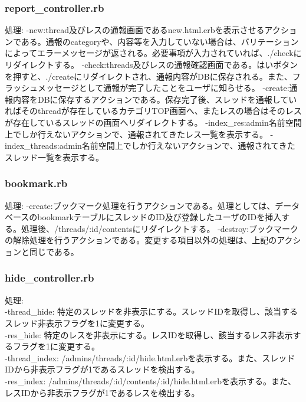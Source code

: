 \documentclass[a4j]{jarticle}
\begin{document}
\subsubsection{report\_controller.rb}
処理:\newline
-new:thread及びレスの通報画面であるnew.html.erbを表示させるアクションである。通報のcategoryや、内容等を入力していない場合は、バリテーションによってエラーメッセージが返される。必要事項が入力されていれば、./checkにリダイレクトする。
-check:threads及びレスの通報確認画面である。はいボタンを押すと、./createにリダイレクトされ、通報内容がDBに保存される。また、フラッシュメッセージとして通報が完了したことをユーザに知らせる。
-create:通報内容をDBに保存するアクションである。保存完了後、スレッドを通報していればそのthreadが存在しているカテゴリTOP画面へ、またレスの場合はそのレスが存在しているスレッドの画面へリダイレクトする。
-index\_res:admin名前空間上でしか行えないアクションで、通報されてきたレス一覧を表示する。
-index\_threads:admin名前空間上でしか行えないアクションで、通報されてきたスレッド一覧を表示する。

\subsubsection{bookmark.rb}
処理:\newline
-create:ブックマーク処理を行うアクションである。処理としては、データベースのbookmarkテーブルにスレッドのID及び登録したユーザのIDを挿入する。処理後、/threads/:id/contentsにリダイレクトする。
-destroy:ブックマークの解除処理を行うアクションである。変更する項目以外の処理は、上記のアクションと同じである。


\subsubsection{hide\_controller.rb}
\noindent
処理:\\
-thread\_hide: 特定のスレッドを非表示にする。スレッドIDを取得し、該当するスレッド非表示フラグを1に変更する。\\
-res\_hide: 特定のレスを非表示にする。レスIDを取得し、該当するレス非表示するフラグを1に変更する。\\
-thread\_index: /admins/threads/:id/hide.html.erbを表示する。また、スレッドIDから非表示フラグが1であるスレッドを検出する。\\
-res\_index: /admins/threads/:id/contents/:id/hide.html.erbを表示する。また、レスIDから非表示フラグが1であるレスを検出する。\\
\end{document}
